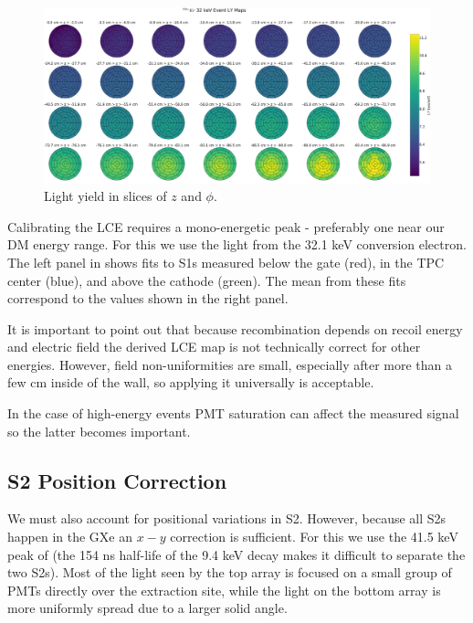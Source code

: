 \begin{figure}
\centering
\includegraphics[width=\textwidth]{LCEMapPolar}
\caption{Light yield in slices of $z$ and $\phi$.}
\label{fig:calibrations_lce_polar}
\end{figure}

Calibrating the LCE requires a mono-energetic peak - preferably one near our DM energy range.  For this we use the light from the
 32.1 keV conversion electron.  The left panel in  shows fits to S1s measured below the gate
(red), in the TPC center (blue), and above the cathode (green).  The mean from these fits correspond to the values shown in the right
panel.

It is important to point out that because recombination depends on recoil energy and electric field the derived LCE map is not
technically correct for other energies.  However, field non-uniformities are small, especially after more than a few cm inside of the
wall, so applying it universally is acceptable.

In the case of high-energy events PMT saturation can
affect the measured signal so the latter becomes important.



\subsection{S2 Position Correction}
\label{subsec:calibrations_s2_position_correction}
We must also account for positional variations in S2.  However, because all S2s happen in the GXe an $x-y$ correction is sufficient.  For
this we use the 41.5 keV peak of  (the 154 ns half-life of the 9.4 keV decay makes it difficult to separate the two
S2s).  Most of the light seen by the top array is focused on a small group of PMTs directly over the extraction site, while the light on
the bottom array is more uniformly spread due to a larger solid angle.

